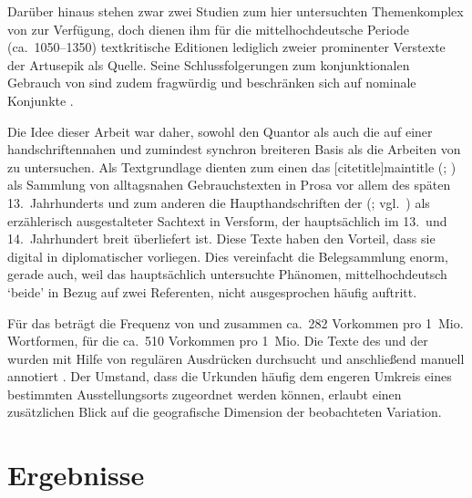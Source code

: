 Darüber hinaus stehen zwar zwei Studien zum hier untersuchten Themenkomplex von
\citet{askedal1973,askedal1974} zur Verfügung, doch dienen ihm für die
mittelhochdeutsche Periode (ca.~1050--1350) textkritische
Editionen lediglich zweier prominenter Verstexte der
Artusepik als Quelle. Seine Schlussfolgerungen zum
konjunktionalen Gebrauch von
 \autocite{askedal1974} sind zudem fragwürdig und beschränken sich
auf nominale Konjunkte \autocite{gjelsten1980}.

Die Idee dieser Arbeit war daher, sowohl den Quantor als auch die
  auf einer handschriftennahen und zumindest
synchron breiteren Basis als die Arbeiten von \citet{askedal1973,askedal1974}
zu untersuchen. Als Textgrundlage dienten zum einen das
[citetitle]{maintitle} (\CAO{};
\nosh\cites{cao1,cao2,cao3,cao4,caor,cao5}) als Sammlung von alltagsnahen
Gebrauchstexten in Prosa vor allem des späten 13.~Jahrhunderts und
zum anderen die Haupthandschriften der  (\KC{};
vgl.~\cites{schroeder1895,nellmann1983}) als erzählerisch ausgestalteter
Sachtext in Versform, der hauptsächlich im 13.\ und 14.\ Jahrhundert breit
über\-liefert ist. Diese Texte haben den Vorteil, dass sie digital in
diplomatischer  vorliegen. Dies vereinfacht die
Belegsammlung enorm, gerade auch, weil das hauptsächlich untersuchte Phänomen,
mittelhochdeutsch  `beide' in Bezug auf zwei
Referenten, nicht ausgesprochen häufig auftritt.

Für das \CAO{} beträgt die Frequenz von  und
 zusammen ca.~282 Vorkommen pro 1~Mio. Wortformen, für die \KC{}
ca.~510 Vorkommen pro 1~Mio. Die Texte des \CAO{} und der \KC{} wurden mit
Hilfe von regulären Ausdrücken durchsucht und
anschließend manuell annotiert \autocites[vgl.\
z.\,B.][33--37]{perkuhnetal2012}[zur Methode
vgl.][207--209]{beckerschallert2021}[155--158]{beckerschallert2022b}. Der
Umstand, dass die Urkunden\is{Urkunde} häufig dem engeren Umkreis eines
bestimmten Ausstellungs\-orts zugeordnet werden können, erlaubt einen
zusätzlichen Blick auf die geografische\is{Dialektgeografie} Dimension der
beobachteten Variation.

\section{Ergebnisse}

